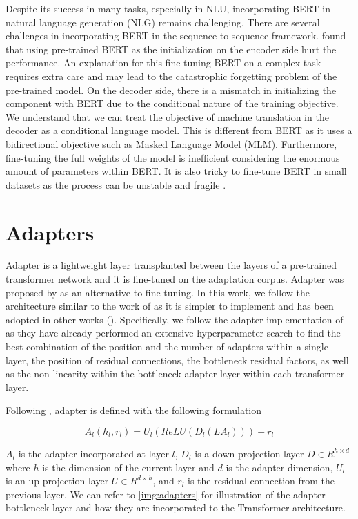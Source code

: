Despite its success in many tasks, especially in NLU, incorporating BERT in natural language generation (NLG) remains challenging. There are several challenges in incorporating BERT in the sequence-to-sequence framework. \cite{Zhu2020IncorporatingBI} found that using pre-trained BERT as the initialization on the encoder side hurt the performance. An explanation for this fine-tuning BERT on a complex task requires extra care and may lead to the catastrophic forgetting problem \cite{mccloskey1989catastrophic} of the pre-trained model. On the decoder side, there is a mismatch in initializing the component with BERT due to the conditional nature of the training objective. We understand that we can treat the objective of machine translation in the decoder as a conditional language model. This is different from BERT as it uses a bidirectional objective such as Masked Language Model (MLM). Furthermore, ﬁne-tuning the full weights of the model is inefﬁcient considering the enormous amount of parameters within BERT. It is also tricky to fine-tune BERT in small datasets as the process can be unstable and fragile \cite{Lee2020MixoutER}.

\section{Adapters}
\label{sec:bm_adapters}
Adapter is a lightweight layer transplanted between the layers of a pre-trained transformer network and it is fine-tuned on the adaptation corpus. Adapter was proposed by \cite{houlsby2019parameter} as an alternative to fine-tuning. In this work, we follow the architecture similar to the work of \cite{bapna2019simple} as it is simpler to implement and has been adopted in other works (\cite{pfeiffer2020madx,ruckle2020adapterdrop,pfeiffer2021adapterfusion}). Specifically, we follow the adapter implementation of \cite{pfeiffer2020madx} as they have already performed an extensive hyperparameter search to find the best combination of the position and the number of adapters within a single layer, the position of residual connections, the bottleneck residual factors, as well as the non-linearity within the bottleneck adapter layer within each transformer layer.

Following \cite{pfeiffer2020madx}, adapter is defined with the following formulation

$$A_l(h_l, r_l) = U_l(ReLU(D_l(LA_l))) + r_l $$

$A_l$ is the adapter incorporated at layer $l$, $D_l$ is a down projection layer $D \in R^{h \times d}$ where $h$ is the dimension of the current layer and $d$ is the adapter dimension, $U_l$ is an up projection layer $U \in R^{d \times h}$, and $r_l$ is the residual connection from the previous layer. We can refer to \ref{img:adapters} for illustration of the adapter bottleneck layer and how they are incorporated to the Transformer architecture.

